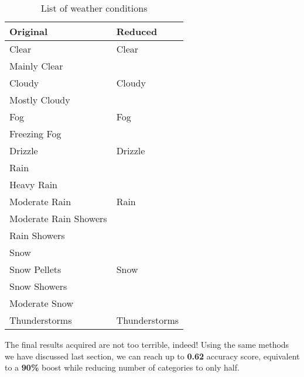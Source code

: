 \begin{table} [h!]
\centering
\caption{List of weather conditions}
\begin{tabular}{l|l} 

\textbf{Original}     &                 \textbf{Reduced}         \\ \hline
Clear                 &                 Clear                    \\
Mainly Clear          &                                          \\ \hline
Cloudy                &                 Cloudy                   \\
Mostly Cloudy         &                                          \\ \hline
Fog                   &                 Fog                      \\ 
Freezing Fog          &                                          \\ \hline
Drizzle               &                 Drizzle                  \\ \hline
Rain                  &                                          \\
Heavy Rain            &                                          \\
Moderate Rain         &                 Rain                     \\ 
Moderate Rain Showers &                                          \\
Rain Showers          &                                          \\ \hline
Snow                  &                                          \\
Snow Pellets          &                 Snow                     \\
Snow Showers          &                                          \\ 
Moderate Snow         &                                          \\ \hline
Thunderstorms         & Thunderstorms                            \\
\end{tabular}
\end{table}

The final results acquired are not too terrible, indeed! Using the same methods we have discussed last section, we can reach up to \textbf{0.62} accuracy score, equivalent to a \textbf{90\%} boost while reducing number of categories to only half.

